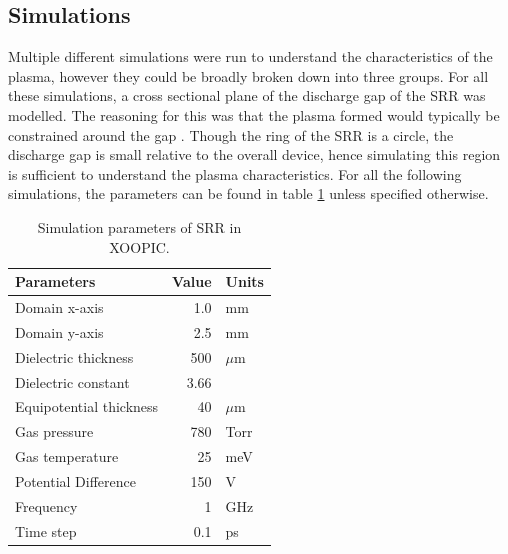 %

\subsection{Simulations}

Multiple different simulations were run to understand the characteristics of the plasma, however they could be broadly broken down into three groups. For all these simulations, a cross sectional plane of the discharge gap of the SRR was modelled. The reasoning for this was that the plasma formed would typically be constrained around the gap \cite{Iza2003}. Though the ring of the SRR is a circle, the discharge gap is small relative to the overall device, hence simulating this region is sufficient to understand the plasma characteristics. For all the following simulations, the parameters can be found in table \ref{tb:basic_simulation_parameters} unless specified otherwise.

\begin{table}[h!]
	\caption{Simulation parameters of SRR in XOOPIC.}
	\vspace{2 pt}
	\centering
	\begin{tabular}{l r l}
		Parameters               & Value    & Units  \\
		\hline 
		Domain x-axis            & 1.0      & mm     \\
		Domain y-axis            & 2.5  	& mm     \\
		Dielectric thickness     & 500      & $\mu$m \\
		Dielectric constant      & 3.66     &        \\
		Equipotential thickness  & 40       & $\mu$m \\
		Gas pressure             & 780      & Torr   \\
		Gas temperature          & 25       & meV    \\
		Potential Difference     & 150      & V      \\
		Frequency                & 1        & GHz    \\
		Time step                & 0.1      & ps
	\end{tabular}
	\label{tb:basic_simulation_parameters}
\end{table}

